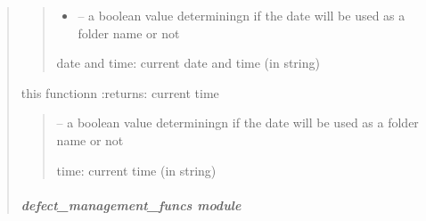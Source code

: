\documentclass[letterpaper,10pt,english]{sphinxmanual}
\begin{document}
\begin{quote}
\begin{savenotes}
\begin{fulllineitems}
\begin{quote}
\begin{description}
\begin{itemize}
\item {} 
\sphinxAtStartPar
{} – a boolean value determiningn if the date will be used as a folder name or not

\end{itemize}

\sphinxAtStartPar
date and time: current date and time (in string)

\end{description}\end{quote}

\end{fulllineitems}\end{savenotes}


\begin{savenotes}\begin{fulllineitems}
\label{\detokenize{setting/backend/date_funcs:oxin.backend.date_funcs.get_time}}
\pysigstartsignatures
{}
\pysigstopsignatures
\sphinxAtStartPar
this functionn :returns: current time
\begin{quote}\begin{description}
\sphinxAtStartPar
{} – a boolean value determiningn if the date will be used as a folder name or not

\sphinxAtStartPar
time: current time (in string)

\end{description}\end{quote}

\end{fulllineitems}\end{savenotes}


\sphinxstepscope


\subparagraph{defect\_management\_funcs module}
\label{\detokenize{setting/backend/defect_management_funcs:module-oxin.backend.defect_management_funcs}}\label{\detokenize{setting/backend/defect_management_funcs:defect-management-funcs-module}}\label{\detokenize{setting/backend/defect_management_funcs::doc}}


\end{quote}
\end{document}
